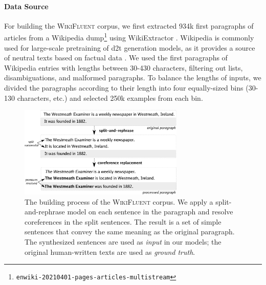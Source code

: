 
\paragraph{Data Source} For building the \textsc{WikiFluent} corpus, we first extracted 934k first paragraphs of articles from a Wikipedia dump\footnote{\texttt{enwiki-20210401-pages-articles-multistream}} using WikiExtractor \cite{Wikiextractor2015}. Wikipedia is commonly used for large-scale pretraining of \ac{d2t} generation models, as it provides a source of neutral texts based on factual data \cite{jinGenWikiDatasetMillion2020,chenKGPTKnowledgeGroundedPreTraining2020}.
We used the first paragraphs of Wikipedia entries with lengths between 30-430 characters, filtering out lists, disambiguations, and malformed paragraphs. To balance the lengths of inputs, we divided the paragraphs according to their length into four equally-sized bins (30-130 characters, etc.) and selected 250k examples from each bin.



\begin{figure}[t]
    \centering
    \includegraphics[width=0.7\textwidth]{img/wikifluent.pdf}
    \caption[Building the \textsc{WikiFluent} corpus.]{The building process of the \textsc{WikiFluent} corpus. We apply a split-and-rephrase model on each sentence in the paragraph and resolve coreferences in the split sentences. The result is a set of simple sentences that convey the same meaning as the original paragraph. The synthesized sentences are used as \textit{input} in our models; the original human-written texts are used as \textit{ground truth}.}\label{fig:wikifluent}
\end{figure}

